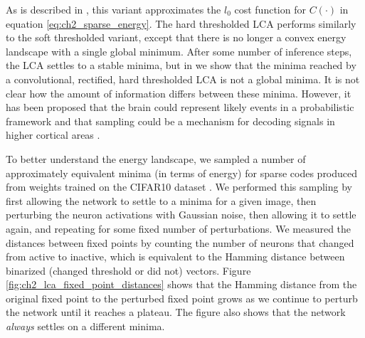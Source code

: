 As is described in \parencite{rozell2008sparse}, this variant approximates the $l_0$ cost function for $C(\cdot)$ in equation \eqref{eq:ch2_sparse_energy}. The hard thresholded LCA performs similarly to the soft thresholded variant, except that there is no longer a convex energy landscape with a single global minimum. After some number of inference steps, the LCA settles to a stable minima, but in \parencite{shainin2016sampling} we show that the minima reached by a convolutional, rectified, hard thresholded LCA is not a global minima. It is not clear how the amount of information differs between these minima. However, it has been proposed that the brain could represent likely events in a probabilistic framework \parencite{lee2003hierarchical} and that sampling could be a mechanism for decoding signals in higher cortical areas \parencite{hoyer2003interpreting}.

To better understand the energy landscape, we sampled a number of approximately equivalent minima (in terms of energy) for sparse codes produced from weights trained on the CIFAR10 dataset \parencite{krizhevsky2009learning}. We performed this sampling by first allowing the network to settle to a minima for a given image, then perturbing the neuron activations with Gaussian noise, then allowing it to settle again, and repeating for some fixed number of perturbations. We measured the distances between fixed points by counting the number of neurons that changed from active to inactive, which is equivalent to the Hamming distance between binarized (changed threshold or did not) vectors. Figure \ref{fig:ch2_lca_fixed_point_distances} shows that the Hamming distance from the original fixed point to the perturbed fixed point grows as we continue to perturb the network until it reaches a plateau. The figure also shows that the network \textit{always} settles on a different minima.

